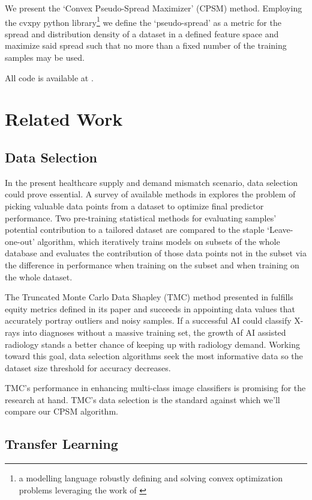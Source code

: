 \documentclass[10pt,twocolumn,letterpaper]{article}
\begin{document}
  We present the `Convex Pseudo-Spread Maximizer' (CPSM) method. Employing the cvxpy python library\footnote{a modelling language robustly defining and solving convex optimization problems leveraging the work of \cite{cvxrewrite}} we define the `pseudo-spread' as a metric for the spread and distribution density of a dataset in a defined feature space and maximize said spread such that no more than a fixed number of the training samples may be used.
  
  All code is available at \cite{dfgit}.
  
 \section{Related Work}
 
 \subsection{Data Selection}
 
 In the present healthcare supply and demand mismatch scenario, data selection could prove essential. 
 A survey of available methods in \cite{datasel} explores the problem of picking valuable data points from a dataset to optimize final predictor performance. Two pre-training statistical methods for evaluating samples' potential contribution to a tailored dataset are compared to the staple `Leave-one-out' algorithm, which iteratively trains models on subsets of the whole database and evaluates the contribution of those data points not in the subset via the difference in performance when training on the subset and when training on the whole dataset. 
 
 
 The Truncated Monte Carlo Data Shapley (TMC) method presented in \cite{datashapley} fulfills equity metrics defined in its paper and succeeds in appointing data values that accurately portray outliers and noisy samples. If a successful AI could classify X-rays into diagnoses without a massive training set, the growth of AI assisted radiology stands a better chance of keeping up with radiology demand. Working toward this goal, data selection algorithms seek the most informative data so the dataset size threshold for accuracy decreases. 
 
 TMC's performance in enhancing multi-class image classifiers is promising for the research at hand. TMC's data selection is the standard against which we'll compare our CPSM algorithm.
 

\subsection{Transfer Learning}
\end{document}
